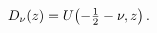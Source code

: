\[\mathop{D_{\nu}\/}\nolimits\!\left(z\right)=\mathop{U\/}\nolimits\!\left(-%
\tfrac{1}{2}-\nu,z\right).\]